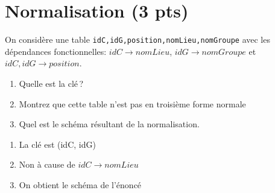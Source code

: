  
\section{Normalisation ({\bf 3 pts})}

On considère une table \texttt{idC,idG,position,nomLieu,nomGroupe} avec
les dépendances fonctionnelles: $idC \to nomLieu$, $idG \to nomGroupe$ et
$idC, idG \to position$.

\begin{enumerate}
   \item Quelle est la clé\,?
   \item Montrez que cette table n'est pas en troisième forme normale
   \item Quel est le schéma résultant de la normalisation.
   
\end{enumerate}
\begin{solution}
   \begin{enumerate}
      \item La clé est (idC, idG)
       \item Non à cause de $idC \to nomLieu$
       \item On obtient le schéma de l'énoncé
    \end{enumerate}
\end{solution}


